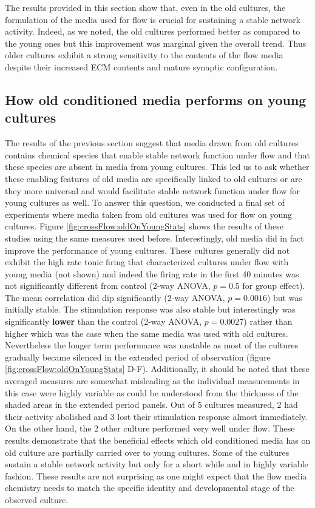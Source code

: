         The results provided in this section show that, even in the old cultures, the formulation of the media used for flow is crucial for sustaining a stable network activity. Indeed, as we noted, the old cultures performed better as compared to the young ones but this improvement was marginal given the overall trend. Thus older cultures exhibit a strong sensitivity to the contents of the flow media despite their increased ECM contents and mature synaptic configuration.

        \subsection{How old conditioned media performs on young cultures}
        The results of the previous section suggest that media drawn from old cultures contains chemical species that enable stable network function under flow and that these species are absent in media from young cultures. This led us to ask whether these enabling features of old media are specifically linked to old cultures or are they more universal and would facilitate stable network function under flow for young cultures as well. To answer this question, we conducted a final set of experiments where media taken from old cultures was used for flow on young cultures. Figure \ref{fig:crossFlow:oldOnYoungStats} shows the results of these studies using the same measures used before. Interestingly, old media did in fact improve the performance of young cultures. These cultures generally did not exhibit the high rate tonic firing that characterized cultures under flow with young media (not shown) and indeed the firing rate in the first 40 minutes was not significantly different from control (2-way ANOVA, \(p=0.5\) for group effect). The mean correlation did dip significantly (2-way ANOVA, \(p=0.0016\)) but was initially stable. The stimulation response was also stable but interestingly was significantly \textbf{lower} than the control (2-way ANOVA, \(p=0.0027\)) rather than higher which was the case when the same media was used with old cultures. Nevertheless the longer term performance was unstable as most of the cultures gradually became silenced in the extended period of observation (figure \ref{fig:crossFlow:oldOnYoungStats} D-F). Additionally, it should be noted that these averaged measures are somewhat misleading as the individual measurements in this case were highly variable as could be understood from the thickness of the shaded areas in the extended period panels. Out of 5 cultures measured, 2 had their activity abolished and 3 lost their stimulation response almost immediately. On the other hand, the 2 other culture performed very well under flow. These results demonstrate that the beneficial effects which old conditioned media has on old culture are partially carried over to young cultures. Some of the cultures sustain a stable network activity but only for a short while and in highly variable fashion. These results are not surprising as one might expect that the flow media chemistry needs to match the specific identity and developmental stage of the observed culture.

